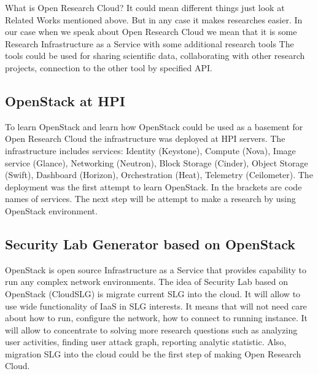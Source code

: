 What is Open Research Cloud? It could mean different things just look at Related Works mentioned above. But in any case it makes researches easier. In our case when we speak about Open Research Cloud we mean that it is some Research Infrastructure as a Service with some additional research tools The tools could be used for sharing scientific data, collaborating with other research projects, connection to the other tool by specified API. 



\subsection{OpenStack at HPI}
To learn OpenStack and learn how OpenStack could be used as a basement for Open Research Cloud the infrastructure was deployed at HPI servers. The infrastructure includes services: Identity (Keystone), Compute (Nova), Image service (Glance), Networking (Neutron), Block Storage (Cinder), Object Storage (Swift), Dashboard (Horizon), Orchestration (Heat), Telemetry (Ceilometer). The deployment was the first attempt to learn OpenStack. In the brackets are code names of services. The next step will be attempt to make a research by using OpenStack environment. 



\subsection{Security Lab Generator based on OpenStack}
OpenStack is open source Infrastructure as a Service that provides capability to run any complex network environments. The idea of Security Lab based on OpenStack (CloudSLG) is migrate current SLG into the cloud. It will allow to use wide functionality of IaaS in SLG interests. It means that will not need care about how to run, configure the network, how to connect to running instance. It will allow to concentrate to solving more research questions such as analyzing user activities, finding user attack graph, reporting analytic statistic. Also, migration SLG into the cloud could be the first step of making Open Research Cloud.    





% 